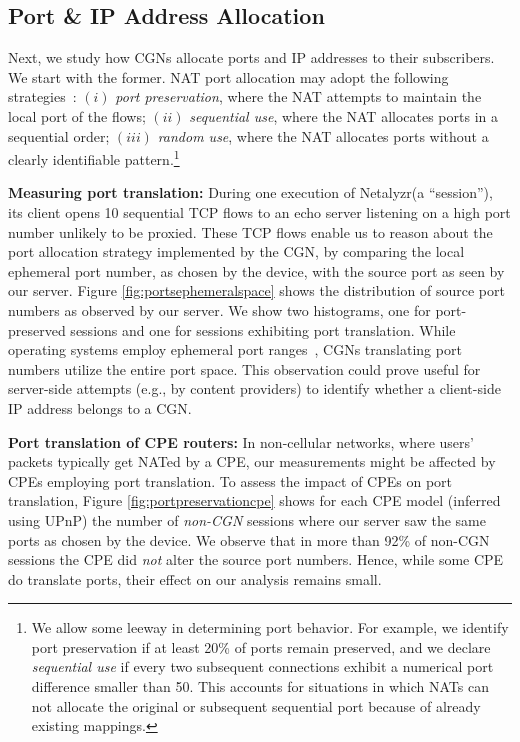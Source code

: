 \documentclass[10pt]{sig-alternate-05-2015}
\newcommand{\neta}{Netalyzr\xspace}
\newcommand{\parax}[1]{\vspace{0.2em} \noindent \textbf{#1:}}
\begin{document}
\subsection{Port \& IP Address Allocation}
\label{sec:ipportallocation}

Next, we study how CGNs allocate ports and IP addresses to their subscribers. 
We start with the former. NAT port allocation may adopt the following
strategies~\cite{rfc4787}: $(i)$ {\em port preservation}, where the NAT attempts to 
maintain the local port of the flows; $(ii)$ {\em sequential use}, where the NAT 
allocates ports in a sequential order; $(iii)$ {\em random use}, where the NAT 
allocates ports without a clearly identifiable pattern.\footnote{We allow some 
leeway in determining port behavior. For example, we identify port preservation
if at least 20\% of ports remain preserved, and we declare \textit{sequential 
use} if every two subsequent connections exhibit a numerical port difference 
smaller than 50. This accounts for situations in which NATs can not allocate 
the original or subsequent sequential port because of already existing 
mappings.}

\parax{Measuring port translation} During one execution of \neta (a
``session''), its client opens 10 sequential TCP flows to an
echo server listening on a high port number unlikely to be
proxied. These TCP flows enable us to reason about the port
allocation strategy implemented by the CGN, by comparing the local
ephemeral port number, as chosen by the device, with the source port
as seen by our server. Figure \ref{fig:portsephemeralspace} shows the
distribution of source port numbers as observed by our server. We show
two histograms, one for port-preserved sessions and one for sessions
exhibiting port translation. While operating systems employ ephemeral
port ranges~\cite{ephemeralportslist}, CGNs translating port numbers
utilize the entire port space. This observation could prove useful for
server-side attempts (e.g., by content providers) to identify whether
a client-side IP address belongs to a CGN.

\parax{Port translation of CPE routers} In non-cellular networks, where users' 
packets typically get NATed by a CPE, our measurements might be affected by 
CPEs employing port translation. To assess the impact of CPEs on port translation, 
Figure \ref{fig:portpreservationcpe} shows for each CPE model (inferred 
using UPnP) the number of \textit{non-CGN} sessions where our server saw the 
same ports as chosen by the device. We observe that in more than 92\% 
of non-CGN sessions the CPE did {\it not} alter the source port numbers. Hence, 
while some CPE do translate ports, their effect on our analysis remains small.
\end{document}
